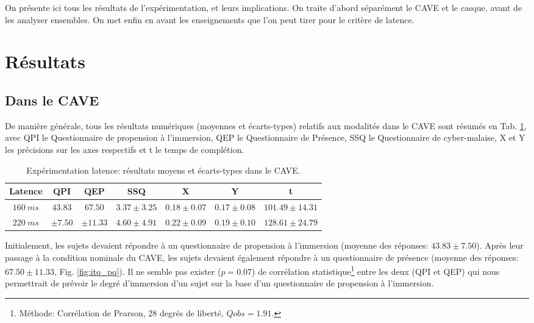 	\par On présente ici tous les résultats de l'expérimentation, et leurs implications. On traite d'abord séparément le CAVE et le casque, avant de les analyser ensembles. On met enfin en avant les enseignements que l'on peut tirer pour le critère de latence.
	
	\section{Résultats}
	\subsection{Dans le CAVE}
	\par De manière générale, tous les résultats numériques (moyennes et écarts-types) relatifs aux modalités dans le CAVE sont résumés en Tab. \ref{tab:resultats_cave_latence}, avec QPI le Questionnaire de propension à l'immersion, QEP le Questionnaire de Présence, SSQ le Questionnaire de cyber-malaise, X et Y les précisions sur les axes respectifs et t le temps de complétion.
	
	\begin{table}[h]	
		\centering
		\caption{Expérimentation latence: résultats moyens et écarts-types dans le CAVE.}
		\label{tab:resultats_cave_latence}
		\begin{tabular}{c|c|c|c|c|c|c}
			\textbf{Latence} & \textbf{QPI} & \textbf{QEP} & \textbf{SSQ} & \textbf{X} & \textbf{Y} & \textbf{t}\\ \hline			
			$160~ms$ & $43.83$ & $67.50$ & $3.37 \pm 3.25$ & $0.18 \pm 0.07$ & $0.17 \pm 0.08$ & $101.49 \pm 14.31$\\
			$220~ms$ & $\pm 7.50$ & $\pm 11.33$ & $4.60 \pm 4.91$ & $0.22 \pm 0.09$ & $0.19 \pm 0.10$ & $128.61 \pm 24.79$\\
		\end{tabular}
	\end{table}
	
	\par Initialement, les sujets devaient répondre à un questionnaire de propension à l'immersion (moyenne des réponses: $43.83 \pm 7.50$).	Après leur passage à la condition nominale du CAVE, les sujets devaient également répondre à un questionnaire de présence (moyenne des réponses: $67.50 \pm 11.33$, Fig. \ref{fig:itq_pq}). Il ne semble pas exister ($p = 0.07$) de corrélation statistique\footnote{Méthode: Corrélation de Pearson, 28 degrés de liberté, $Qobs = 1.91$.} entre les deux (QPI et QEP) qui nous permettrait de prévoir le degré d'immersion d'un sujet sur la base d'un questionnaire de propension à l'immersion.
	
